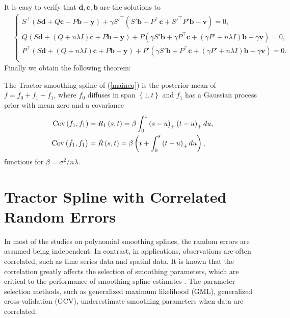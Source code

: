 It is easy to verify that $\mathbf{d},\mathbf{c},\mathbf{b}$ are the solutions to
\begin{align*}
&\begin{cases}
S^\top \left(S\mathbf{d} +Q\mathbf{c}+P\mathbf{b}-\mathbf{y}\right) +\gamma S'^\top\left( S'\mathbf{b}+ P^\top \mathbf{c}+S'^\top P'\mathbf{b}-\mathbf{v}\right)=0, \\
Q\left(S\mathbf{d}+\left(Q+n\lambda I\right)\mathbf{c}+P\mathbf{b}-\mathbf{y}\right) + P \left( \gamma S' \mathbf{b} + \gamma P^\top \mathbf{c}+ \left(\gamma P'+n\lambda I\right) \mathbf{b}- \gamma \mathbf{v}\right)=0, \\
P^\top \left(S\mathbf{d}+\left(Q+n\lambda I\right) \mathbf{c} +P\mathbf{b}-\mathbf{y}\right)+P'\left(\gamma S'\mathbf{b}+P^\top \mathbf{c}+\left(\gamma P'+n\lambda I\right)\mathbf{b}- \gamma\mathbf{v}\right)=0. \\
\end{cases}
\end{align*}
Finally we obtain the following theorem: 
\begin{theorem}
The Tractor smoothing spline of (\ref{maineq}) is the posterior
mean of $f=f_0+f_1 + \dot{f}_1$, where $f_0$ diffuses in span $\left\lbrace  1,t\right\rbrace$ and $f_1$ has a Gaussian process prior with mean zero and a covariance 
\begin{align*}
\mathrm{Cov} \left(f_1,f_1\right)   &= R_1\left(s,t\right)   =\beta \int_{0}^{1} \left(s-u\right)_+\left(t-u\right)_+du, \\
\mathrm{Cov} \left(\dot{f}_1,f_1\right)  &= \dot{R}\left(s,t\right) =\beta \left(t+\int_0^s\left(t-u\right)_+du \right),
\end{align*}
functions for $\beta = \sigma^2/n\lambda$.
\end{theorem}



\section{Tractor Spline with Correlated Random Errors}


In most of the studies on polynomial smoothing splines, the random errors are assumed being independent. In contrast, in applications, observations are often correlated, such as time series data and spatial data. It is known that the correlation greatly affects the selection of smoothing parameters, which are critical to the performance of smoothing spline estimates \cite{wang1998smoothing}.  The parameter selection methods, such as generalized maximum likelihood (GML), generalized cross-validation (GCV), underestimate smoothing parameters when data are correlated. 


